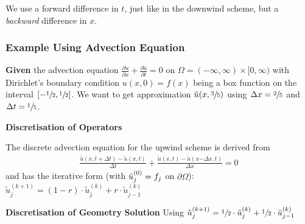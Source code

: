 We use a forward difference in $t$, just like in the downwind scheme,
but a \emph{backward} difference in $x$.

\subsubsection{Example Using Advection Equation}
\textbf{Given} the advection equation
$\frac{\partial u}{\partial x} + \frac{\partial u}{\partial t} = 0$ on
$\Omega = (-\infty,\infty)\times[0,\infty)$ with Dirichlet's boundary condition
$u(x,0) = f(x)$ being a box function on the interval $[-\sfrac{1}{2},\sfrac{1}{2}]$.
We want to get approximation $\tilde{u}(x,\sfrac{3}{5})$ using
$\Delta x = \sfrac{2}{5}$ and $\Delta t = \sfrac{1}{5}$.

\textbf{Discretisation of Operators}

The discrete advection equation for the upwind scheme is derived from
\begin{align*}
	\frac{\tilde{u}(x,t+\Delta t)-\tilde{u}(x,t)}{\Delta t}+\frac{\tilde{u}(x,t)-\tilde{u}(x\mathbf{-}\Delta x,t)}{\Delta x}=0
\end{align*}
and has the iterative form (with $\tilde{u}_j^{(0)}=f_j$ on $\partial\Omega$):
\colorbox{shadecolor}{$
	\displaystyle\tilde{u}_{j}^{(k+1)}=(1-r)\cdot\tilde{u}_{j}^{(k)}+r\cdot\tilde{u}_{j-1}^{(k)}
$}

\textbf{Discretisation of Geometry}
\textbf{Solution}
Using $\tilde{u}_j^{(k+1)} = \sfrac{1}{2}\cdot\tilde{u}_j^{(k)} + \sfrac{1}{2}\cdot\tilde{u}_{j-1}^{(k)}$
